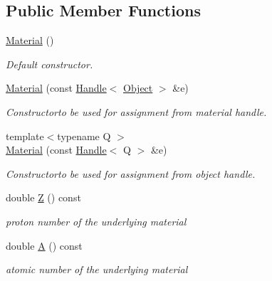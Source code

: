 \subsection*{Public Member Functions}
\begin{DoxyCompactItemize}
\item 
\hyperlink{class_d_d4hep_1_1_geometry_1_1_material_a0af6f273d664a63108c7100913355d98}{Material} ()
\begin{DoxyCompactList}\small\item\em Default constructor. \item\end{DoxyCompactList}\item 
\hyperlink{class_d_d4hep_1_1_geometry_1_1_material_a33fffc1be75fb353a8df0f982fb05269}{Material} (const \hyperlink{class_d_d4hep_1_1_handle}{Handle}$<$ \hyperlink{class_d_d4hep_1_1_geometry_1_1_material_afdf167b558006f1bf7348fa5e812f4d8}{Object} $>$ \&e)
\begin{DoxyCompactList}\small\item\em Constructorto be used for assignment from material handle. \item\end{DoxyCompactList}\item 
{\footnotesize template$<$typename Q $>$ }\\\hyperlink{class_d_d4hep_1_1_geometry_1_1_material_a7b3044f4aed147daa04197d850014e10}{Material} (const \hyperlink{class_d_d4hep_1_1_handle}{Handle}$<$ Q $>$ \&e)
\begin{DoxyCompactList}\small\item\em Constructorto be used for assignment from object handle. \item\end{DoxyCompactList}\item 
double \hyperlink{class_d_d4hep_1_1_geometry_1_1_material_abf2d1a8681be6bd3506956fbc171df1f}{Z} () const 
\begin{DoxyCompactList}\small\item\em proton number of the underlying material \item\end{DoxyCompactList}\item 
double \hyperlink{class_d_d4hep_1_1_geometry_1_1_material_ae038c0ceb3eddca9291e6fa440291c90}{A} () const 
\begin{DoxyCompactList}\small\item\em atomic number of the underlying material \item\end{DoxyCompactList}\item 

\end{DoxyCompactItemize}

